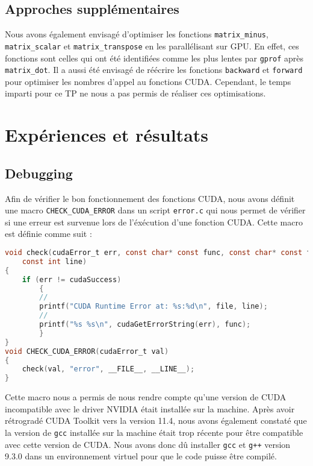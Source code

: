 \documentclass[12pt, a4paper]{article}
\begin{document}
\subsection{Approches supplémentaires}

Nous avons également envisagé d'optimiser les fonctions \texttt{matrix\_minus}, \texttt{matrix\_scalar} et \texttt{matrix\_transpose} en les parallélisant sur GPU. En effet, ces fonctions sont celles qui ont été identifiées comme les plus lentes par \texttt{gprof} après \texttt{matrix\_dot}. Il a aussi été envisagé de réécrire les fonctions \texttt{backward} et \texttt{forward} pour optimiser les nombres d'appel au fonctions CUDA. Cependant, le temps imparti pour ce TP ne nous a pas permis de réaliser ces optimisations.

\section{Expériences et résultats}

\subsection{Debugging}

Afin de vérifier le bon fonctionnement des fonctions CUDA, nous avons définit une macro \texttt{CHECK\_CUDA\_ERROR} dans un script \texttt{error.c} qui nous permet de vérifier si une erreur est survenue lors de l'éxécution d'une fonction CUDA. Cette macro est définie comme suit :

\begin{lstlisting}[language=c, caption={Macro \texttt{CHECK\_CUDA\_ERROR}}, label={lst:check_cuda_error}, ]
void check(cudaError_t err, const char* const func, const char* const file,
    const int line)
{
    if (err != cudaSuccess)
        {
        //
        printf("CUDA Runtime Error at: %s:%d\n", file, line);
        // 
        printf("%s %s\n", cudaGetErrorString(err), func);
        }
}
void CHECK_CUDA_ERROR(cudaError_t val)
{
    check(val, "error", __FILE__, __LINE__);
}
\end{lstlisting}

Cette macro nous a permis de nous rendre compte qu'une version de CUDA incompatible avec le driver NVIDIA était installée sur la machine. Après avoir rétrogradé CUDA Toolkit vers la version 11.4, nous avons également constaté que la version de \texttt{gcc} installée sur la machine était trop récente pour être compatible avec cette version de CUDA. Nous avons donc dû installer \texttt{gcc} et \texttt{g++} version 9.3.0 dans un environnement virtuel pour que le code puisse être compilé.
\end{document}

